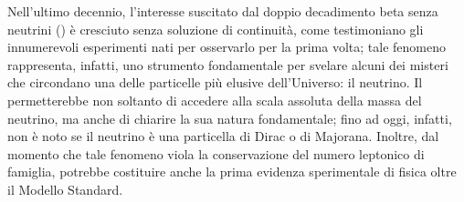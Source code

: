 




Nell'ultimo decennio, l'interesse suscitato dal doppio decadimento beta senza neutrini (\doppiobeta) è cresciuto senza soluzione di continuità, come testimoniano gli innumerevoli esperimenti nati per osservarlo per la prima volta; tale fenomeno rappresenta, infatti, uno strumento fondamentale per svelare alcuni dei misteri che circondano una delle particelle più elusive dell'Universo: il neutrino. 
Il \doppiobeta{} permetterebbe non soltanto di accedere alla scala assoluta della massa del neutrino, ma anche di chiarire la sua natura fondamentale; fino ad oggi, infatti, non è noto se il neutrino è una particella di Dirac o di Majorana. 
Inoltre, dal momento che tale fenomeno viola la conservazione del numero leptonico di famiglia, potrebbe costituire anche la prima evidenza sperimentale di fisica oltre il Modello Standard.


